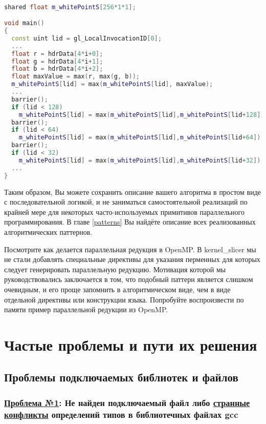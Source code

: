 \documentclass[11pt,fleqn,english,russian]{report} %
\begin{document}
\begin{lstlisting}[language=C++, 
	               caption=Фрагмент сгенерированного GLSL шейдера для параллельной редукции, 
	               label=lst:finMaxShaders]	

shared float m_whitePointS[256*1*1]; 

void main()
{	               
  const uint lid = gl_LocalInvocationID[0];
  ...	               
  float r = hdrData[4*i+0];
  float g = hdrData[4*i+1];
  float b = hdrData[4*i+2];
  float maxValue = max(r, max(g, b));
  m_whitePointS[lid] = max(m_whitePointS[lid], maxValue);
  ...
  barrier();
  if (lid < 128) 
  	m_whitePointS[lid] = max(m_whitePointS[lid],m_whitePointS[lid+128]);
  barrier();
  if (lid < 64) 
  	m_whitePointS[lid] = max(m_whitePointS[lid],m_whitePointS[lid+64]);
  barrier();
  if (lid < 32) 
  	m_whitePointS[lid] = max(m_whitePointS[lid],m_whitePointS[lid+32]);
  ...
}  
\end{lstlisting}

Таким образом, Вы можете сохранить описание вашего алгоритма в простом виде с последовательной логикой, и не заниматься самостоятельной реализаций по крайней мере для некоторых часто-используемых примитивов параллельного программирования. В главе \ref{patterns} Вы найдёте описание всех реализованных алгоритмических паттернов.

\begin{remark}
Посмотрите как делается параллельная редукция в OpenMP. В kernel\_slicer мы не стали добавлять специальные директивы для указания перменных для которых следует генерировать параллельную редукцию. Мотивация которой мы руководствовались заключается в том, что подобный паттерн является слишком очевидным, и его проще запомнить в алгоритмическом виде, чем в виде отдельной директивы или конструкции языка. Попробуйте воспроизвести по памяти пример параллельной редукции из OpenMP. 
\end{remark}

\chapter{Частые проблемы и пути их решения}

\section{Проблемы подключаемых библиотек и файлов}

\subsection{\underline{Проблема №1}: Не найден подключаемый файл либо \underline{странные конфликты} определений типов в библиотечных файлах gcc}
\end{document}
